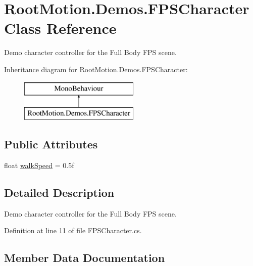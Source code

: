 \hypertarget{class_root_motion_1_1_demos_1_1_f_p_s_character}{}\section{Root\+Motion.\+Demos.\+F\+P\+S\+Character Class Reference}
\label{class_root_motion_1_1_demos_1_1_f_p_s_character}


Demo character controller for the Full Body F\+PS scene.  


Inheritance diagram for Root\+Motion.\+Demos.\+F\+P\+S\+Character\+:\begin{figure}[H]
\begin{center}
\leavevmode
\includegraphics[height=2.000000cm]{class_root_motion_1_1_demos_1_1_f_p_s_character}
\end{center}
\end{figure}
\subsection*{Public Attributes}
\begin{DoxyCompactItemize}
\item 
float \mbox{\hyperlink{class_root_motion_1_1_demos_1_1_f_p_s_character_af7152855b43a259e1fb2ee143481efdc}{walk\+Speed}} = 0.\+5f
\end{DoxyCompactItemize}


\subsection{Detailed Description}
Demo character controller for the Full Body F\+PS scene. 



Definition at line 11 of file F\+P\+S\+Character.\+cs.



\subsection{Member Data Documentation}
\mbox{\label{class_root_motion_1_1_demos_1_1_f_p_s_character_af7152855b43a259e1fb2ee143481efdc}} 
